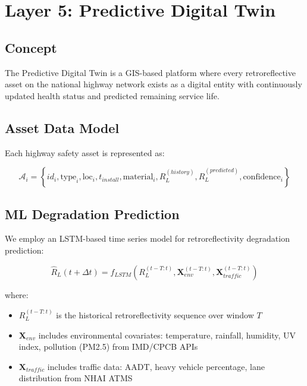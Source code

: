 \documentclass[11pt,a4paper]{article}
\begin{document}
\section{Layer 5: Predictive Digital Twin}
\label{sec:layer5}

\subsection{Concept}

The Predictive Digital Twin is a GIS-based platform where every retroreflective asset on the national highway network exists as a digital entity with continuously updated health status and predicted remaining service life.

\subsection{Asset Data Model}

Each highway safety asset is represented as:

\begin{equation}
\mathcal{A}_i = \left\{id_i, \text{type}_i, \text{loc}_i, t_{install}, \text{material}_i, R_L^{(history)}, \hat{R}_L^{(predicted)}, \text{confidence}_i\right\}
\label{eq:asset_model}
\end{equation}

\subsection{ML Degradation Prediction}

We employ an LSTM-based time series model for retroreflectivity degradation prediction:

\begin{equation}
\hat{R}_L(t + \Delta t) = f_{LSTM}\left(R_L^{(t-T:t)}, \mathbf{X}_{env}^{(t-T:t)}, \mathbf{X}_{traffic}^{(t-T:t)}\right)
\label{eq:lstm_prediction}
\end{equation}

where:
\begin{itemize}[noitemsep]
    \item $R_L^{(t-T:t)}$ is the historical retroreflectivity sequence over window $T$
    \item $\mathbf{X}_{env}$ includes environmental covariates: temperature, rainfall, humidity, UV index, pollution (PM2.5) from IMD/CPCB APIs
    \item $\mathbf{X}_{traffic}$ includes traffic data: AADT, heavy vehicle percentage, lane distribution from NHAI ATMS
\end{itemize}
\end{document}
